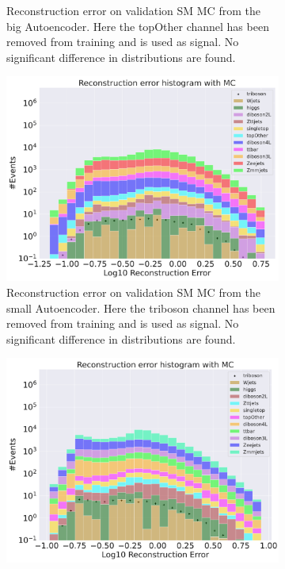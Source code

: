 \begin{figure}[h!]
\begin{subfigure}{.45\textwidth}
        \caption{Reconstruction error on validation SM MC from the big Autoencoder. Here the topOther channel has been removed from training and 
        is used as signal. No significant difference in distributions are found. }
        \label{fig:vae_big_topOther}
    \end{subfigure}
    \hfill
    \begin{subfigure}{.45\textwidth}
        \includegraphics[width=\textwidth]{Figures/VAE_testing/small/b_data_recon_big_rm3_feats_sig_triboson.pdf}
        \caption{Reconstruction error on validation SM MC from the small Autoencoder. Here the triboson channel has been removed from training and 
        is used as signal. No significant difference in distributions are found. }
        \label{fig:vae_small_triboson}
    \end{subfigure}
    \hfill 
    \begin{subfigure}{.45\textwidth}
        \includegraphics[width=\textwidth]{Figures/VAE_testing/big/b_data_recon_big_rm3_feats_sig_triboson.pdf}

\end{subfigure}
\end{figure}
